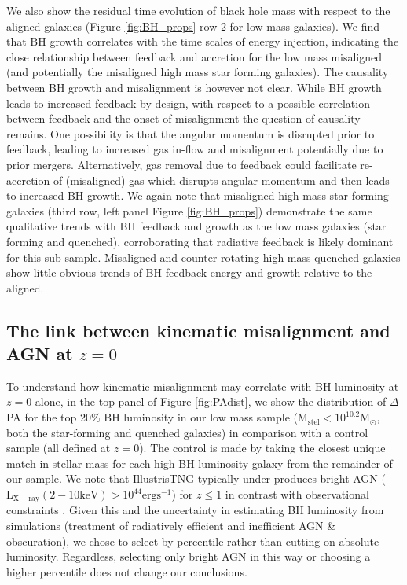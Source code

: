 We also show the residual time evolution of black hole mass with respect to the aligned galaxies (Figure \ref{fig:BH_props} row 2 for low mass galaxies). We find that BH growth correlates with the time scales of energy injection, indicating the close relationship between feedback and accretion for the low mass misaligned (and potentially the misaligned high mass star forming galaxies). The causality between BH growth and misalignment is however not clear. While BH growth leads to increased feedback by design, with respect to a possible correlation between feedback and the onset of misalignment the question of causality remains. One possibility is that the angular momentum is disrupted prior to feedback, leading to increased gas in-flow and misalignment potentially due to prior mergers. Alternatively, gas removal due to feedback could facilitate re-accretion of (misaligned) gas which disrupts angular momentum and then leads to increased BH growth. We again note that misaligned high mass star forming galaxies (third row, left panel Figure \ref{fig:BH_props}) demonstrate the same qualitative trends with BH feedback and growth as the low mass galaxies (star forming and quenched), corroborating that radiative feedback is likely dominant for this sub-sample. Misaligned and counter-rotating high mass quenched galaxies show little obvious trends of BH feedback energy and growth relative to the aligned.

\subsection{The link between kinematic misalignment and AGN at $z=0$}
To understand how kinematic misalignment may correlate with BH luminosity at $z=0$ alone, in the top panel of Figure \ref{fig:PAdist}, we show the distribution of $\Delta$PA for the top 20\% BH luminosity in our low mass sample ($\mathrm{M_{stel} < 10^{10.2}M_{\odot}}$, both the star-forming and quenched galaxies) in comparison with a control sample (all defined at $z=0$). The control is made by taking the closest unique match in stellar mass for each high BH luminosity galaxy from the remainder of our sample. We note that IllustrisTNG typically under-produces bright AGN ($\mathrm{L_{X-ray}(2-10 keV) > 10^{44}ergs^{-1}}$) for $z \leq 1$ in contrast with observational constraints \citep[see][]{habouzit2019}. Given this and the uncertainty in estimating BH luminosity from simulations (treatment of radiatively efficient and inefficient AGN \& obscuration), we chose to select by percentile rather than cutting on absolute luminosity. Regardless, selecting only bright AGN in this way or choosing a higher percentile does not change our conclusions.

